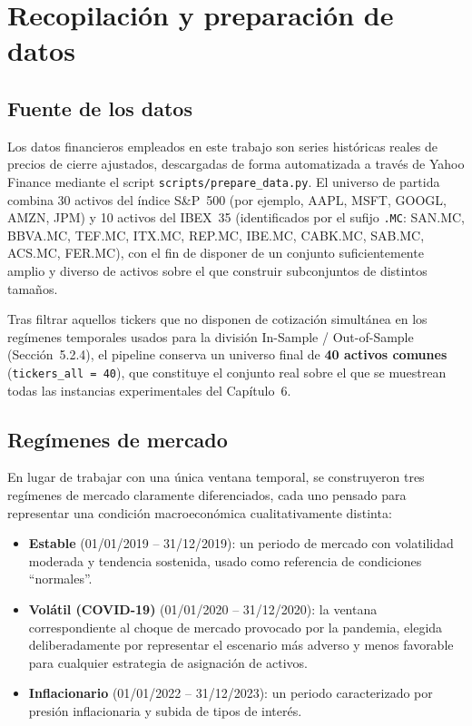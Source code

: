 \section{Recopilación y preparación de datos}
\label{sec:datos}

\subsection{Fuente de los datos}

Los datos financieros empleados en este trabajo son series históricas reales de precios de cierre ajustados, descargadas de forma automatizada a través de Yahoo Finance mediante el script \texttt{scripts/prepare\_data.py}. El universo de partida combina 30 activos del índice S\&P~500 (por ejemplo, AAPL, MSFT, GOOGL, AMZN, JPM) y 10 activos del IBEX~35 (identificados por el sufijo \texttt{.MC}: SAN.MC, BBVA.MC, TEF.MC, ITX.MC, REP.MC, IBE.MC, CABK.MC, SAB.MC, ACS.MC, FER.MC), con el fin de disponer de un conjunto suficientemente amplio y diverso de activos sobre el que construir subconjuntos de distintos tamaños.

Tras filtrar aquellos tickers que no disponen de cotización simultánea en los regímenes temporales usados para la división In-Sample / Out-of-Sample (Sección~5.2.4), el pipeline conserva un universo final de \textbf{40 activos comunes} (\texttt{tickers\_all = 40}), que constituye el conjunto real sobre el que se muestrean todas las instancias experimentales del Capítulo~6.

\subsection{Regímenes de mercado}

En lugar de trabajar con una única ventana temporal, se construyeron tres regímenes de mercado claramente diferenciados, cada uno pensado para representar una condición macroeconómica cualitativamente distinta:

\begin{itemize}
    \item \textbf{Estable} (01/01/2019 -- 31/12/2019): un periodo de mercado con volatilidad moderada y tendencia sostenida, usado como referencia de condiciones ``normales''.
    \item \textbf{Volátil (COVID-19)} (01/01/2020 -- 31/12/2020): la ventana correspondiente al choque de mercado provocado por la pandemia, elegida deliberadamente por representar el escenario más adverso y menos favorable para cualquier estrategia de asignación de activos.
    \item \textbf{Inflacionario} (01/01/2022 -- 31/12/2023): un periodo caracterizado por presión inflacionaria y subida de tipos de interés.
\end{itemize}

